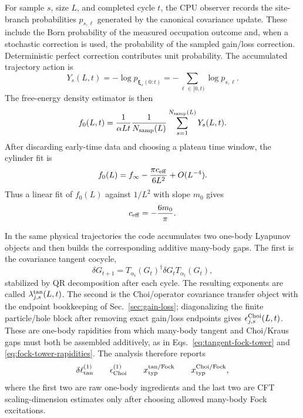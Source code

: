 \documentclass[aps,prb,onecolumn,nofootinbib,superscriptaddress]{revtex4-2}
\newcommand{\bxi}{{\boldsymbol{\xi}}}
\theoremstyle{plain}
\theoremstyle{definition}
\begin{document}
For sample \(s\), size \(L\), and completed cycle \(t\), the CPU observer
records the site-branch probabilities \(p_{s,\ell}\) generated by the
canonical covariance update.  These include the Born probability of the
measured occupation outcome and, when a stochastic correction is used, the
probability of the sampled gain/loss correction.  Deterministic perfect
correction contributes unit probability.  The accumulated trajectory action is
\begin{equation}
  Y_s(L,t)
  =
  -\log p_{\bxi_s(0:t)}
  =
  -\sum_{\ell\in[0,t)}\log p_{s,\ell}.
  \label{eq:cpu-trajectory-action}
\end{equation}
The free-energy density estimator is then
\begin{equation}
  f_0(L,t)
  =
  \frac{1}{\alpha L t}
  \frac{1}{N_{\rm samp}(L)}
  \sum_{s=1}^{N_{\rm samp}(L)}Y_s(L,t).
  \label{eq:cpu-f0-estimator}
\end{equation}
After discarding early-time data and choosing a plateau time window, the
cylinder fit is
\begin{equation}
  f_0(L)
  =
  f_\infty
  -
  \frac{\pi c_{\rm eff}}{6L^2}
  +
  O(L^{-4}).
  \label{eq:cpu-ceff-fit}
\end{equation}
Thus a linear fit of \(f_0(L)\) against \(1/L^2\) with slope \(m_0\) gives
\begin{equation}
  c_{\rm eff}=-\frac{6m_0}{\pi}.
  \label{eq:cpu-ceff-from-slope}
\end{equation}

In the same physical trajectories the code accumulates two one-body Lyapunov
objects and then builds the corresponding additive many-body gaps.  The first
is the covariance tangent cocycle,
\begin{equation}
  \delta G_{t+1}
  =
  T_{\alpha_t}(G_t)^\dagger
  \delta G_t
  T_{\alpha_t}(G_t),
  \label{eq:cpu-tangent-object}
\end{equation}
stabilized by QR decomposition after each cycle.  The resulting exponents are
called \(\lambda^{\rm tan}_{j,s}(L,t)\).  The second is the Choi/operator
covariance transfer object with the endpoint bookkeeping of
Sec.~\ref{sec:gain-loss}; diagonalizing the finite particle/hole block after
removing exact gain/loss endpoints gives
\(\epsilon^{\rm Choi}_{j,s}(L,t)\).  These are one-body rapidities from which
many-body tangent and Choi/Kraus gaps must both be assembled additively, as in
Eqs.~\eqref{eq:tangent-fock-tower} and
\eqref{eq:fock-tower-rapidities}.  The analysis therefore reports
\begin{equation}
  \delta\ell_{\rm tan}^{(1)}
  \qquad
  \epsilon_{\rm Choi}^{(1)}
  \qquad
  x_{\rm typ}^{\rm tan/Fock}
  \qquad
  x_{\rm typ}^{\rm Choi/Fock},
  \label{eq:three-spectrum-labels}
\end{equation}
where the first two are raw one-body ingredients and the last two are CFT
scaling-dimension estimates only after choosing allowed many-body Fock
excitations.
\end{document}
